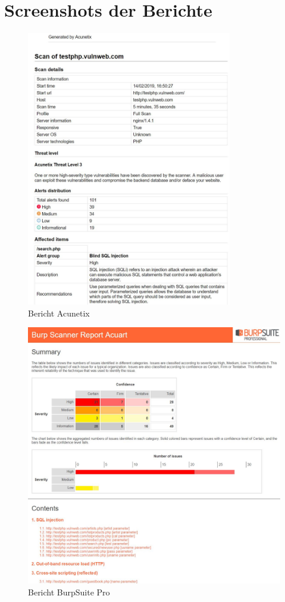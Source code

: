 \documentclass[12pt,oneside,a4paper,parskip,pointlessnumbers]{scrbook}
\begin{document}
  \chapter{Screenshots der Berichte}
  \begin{figure}[htb!]
    \centering
      \includegraphics[width=0.8\textwidth]{Images/ScrAcunetix}
    \caption[Bericht Acunetix]{Bericht Acunetix}
  \end{figure}
  \begin{figure}[htb!]
    \centering
      \includegraphics[width=1\textwidth]{Images/ScrBurp}
    \caption[Bericht BurpSuite Pro]{Bericht BurpSuite Pro}
  \end{figure}
\end{document}
